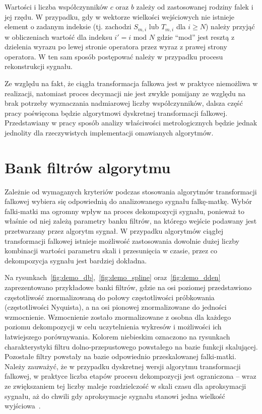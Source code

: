 Wartości i liczba współczynników $c$ oraz $b$ zależy od zastosowanej rodziny falek i jej rzędu. W przypadku, gdy w wektorze wielkości wejściowych nie istnieje element o zadanym indeksie (tj. zachodzi $S_{m,i}$ lub $T_{m,i}$ dla $i \ge N$) należy przyjąć w obliczeniach wartość dla indeksu $i' = i \text{ mod } N$ gdzie \enquote{mod} jest resztą z dzielenia wyrazu po lewej stronie operatora przez wyraz z prawej strony operatora. W ten sam sposób postępować należy w przypadku procesu rekonstrukcji sygnału.

Ze względu na fakt, że ciągła transformacja falkowa jest w praktyce niemożliwa w realizacji, natomiast proces decymacji nie jest zwykle pomijany ze względu na brak potrzeby wyznaczania nadmiarowej liczby współczynników, dalsza część pracy poświęcona będzie algorytmowi dyskretnej transformacji falkowej. Przedstawiany w pracy sposób analizy właściwości metrologicznych będzie jednak jednolity dla rzeczywistych implementacji omawianych algorytmów.

\section{Bank filtrów algorytmu}

Zależnie od wymaganych kryteriów podczas stosowania algorytmów transformacji falkowej wybiera się odpowiednią do analizowanego sygnału falkę-matkę. Wybór falki-matki ma ogromny wpływ na proces dekompozycji sygnału, ponieważ to właśnie od niej zależą parametry banku filtrów, na którego wejście podawany jest przetwarzany przez algorytm sygnał. W przypadku algorytmów ciągłej transformacji falkowej istnieje możliwość zastosowania dowolnie dużej liczby kombinacji wartości parametru skali i przesunięcia w czasie, przez co dekompozycja sygnału jest bardziej dokładna.

Na rysunkach~\ref{fig:demo_db},~\ref{fig:demo_spline} oraz~\ref{fig:demo_dden} zaprezentowano przykładowe banki filtrów, gdzie na osi poziomej przedstawiono częstotliwość znormalizowaną do połowy częstotliwości próbkowania (częstotliwości Nyquista), a na osi pionowej znormalizowane do jedności wzmocnienie. Wzmocnienie zostało znormalizowane z osobna dla każdego poziomu dekompozycji w celu uczytelnienia wykresów i możliwości ich łatwiejszego porównywania. Kolorem niebieskim oznaczono na rysunkach charakterystyki filtru dolno-przepustowego powstałego na bazie funkcji skalującej. Pozostałe filtry powstały na bazie odpowiednio przeskalowanej falki-matki. Należy zauważyć, że w przypadku dyskretnej wersji algorytmu transformacji falkowej, w praktyce liczba etapów procesu dekompozycji jest ograniczona -- wraz ze zwiększaniem tej liczby maleje rozdzielczość w skali czasu dla aproksymacji sygnału, aż do chwili gdy aproksymacje sygnału stanowi jedna wielkość wyjściowa~\cite{wallen_handbook}.

